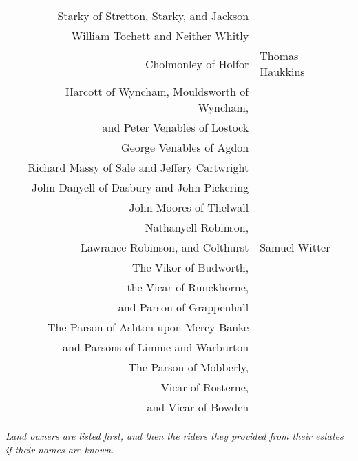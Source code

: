 \begin{center}
\begin{tabular}{rl}
    Starky of Stretton, Starky, and Jackson & \dotfill \\
    William Tochett and Neither Whitly & \dotfill \\
    Cholmonley of Holfor & Thomas Haukkins \\
    Harcott of Wyncham, Mouldsworth of Wyncham, \\ and Peter Venables of Lostock & \\
    George Venables of Agdon & \dotfill \\
    Richard Massy of Sale and Jeffery Cartwright & \dotfill \\
    John Danyell of Dasbury and John Pickering & \dotfill \\
    John Moores of Thelwall & \dotfill \\
    Nathanyell Robinson, \\ Lawrance Robinson, and Colthurst & Samuel Witter \\
    The Vikor of Budworth, \\ the Vicar of Runckhorne, \\ and Parson of Grappenhall & \dotfill \\
    The Parson of Ashton upon Mercy Banke \\ and Parsons of Limme and Warburton & \dotfill \\
    The Parson of Mobberly, \\ Vicar of Rosterne, \\ and Vicar of Bowden & \dotfill \\
  \end{tabular}
\end{center}

\vfill

\begin{center}
  \noindent
  \it
  \small
  Land owners are listed first, and then the riders they provided from their estates if their names are known.
\end{center}
